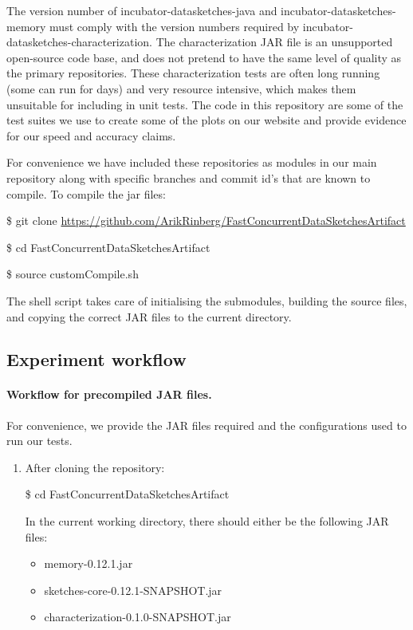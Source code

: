 \documentclass{sigplanconf}
\begin{document}
{\noindent The version number of incubator-datasketches-java
and incubator-datasketches-memory must comply with the version numbers required by incubator-datasketches-characterization.
The characterization JAR file is an unsupported open-source code base, and
does not pretend to have the same level of quality as the primary repositories.
These characterization tests are often long running (some can run for days) and very resource intensive, which makes
them unsuitable for including in unit tests. The code in this repository are some of
the test suites we use to create some of the plots on our website and provide evidence for our speed and accuracy claims. 

For convenience we have included these repositories as modules in our main repository along with specific branches and commit id's
that are known to compile. To compile the jar files:
\begin{framed}

\$ git clone \url{https://github.com/ArikRinberg/FastConcurrentDataSketchesArtifact}

\$ cd FastConcurrentDataSketchesArtifact

\$ source customCompile.sh

\end{framed}

\noindent The shell script takes care of initialising the submodules, building the source files, and copying the correct
JAR files to the current directory.

\subsection{Experiment workflow}

\paragraph{\textbf{Workflow for precompiled JAR files.}}
For convenience, we provide the JAR files required and the configurations
used to run our tests.

\begin{enumerate}
  \item After cloning the repository:

  \hrulefill

  \$ cd FastConcurrentDataSketchesArtifact

  \hrulefill

  \noindent In the current working directory, there should either be the following JAR files:
  \begin{itemize}
    \item memory-0.12.1.jar
    \item sketches-core-0.12.1-SNAPSHOT.jar
    \item characterization-0.1.0-SNAPSHOT.jar
  \end{itemize}



\end{enumerate}}
\end{document}
